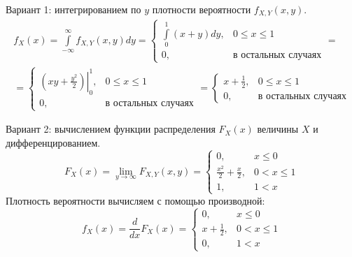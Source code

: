 \begin{enumerate}
    Вариант 1: интегрированием по $y$ плотности вероятности $f_{X,Y}(x,y)$.
    \begin{multline}
        f_X(x)
        = \int \limits_{-\infty}^{\infty} f_{X,Y}(x,y) dy
        =
        \left \{
        \begin{array}{ll}
            \int \limits_0^1 (x + y) dy, & 0 \le x \le 1              \\
            0,                           & \text{в остальных случаях}
        \end{array}
        \right . = \\
%
        =
        \left \{
        \begin{array}{ll}
            \left . \left ( x y + \frac{y^2}{2} \right ) \right |_0^1, & 0 \le x \le 1              \\
            0,                                                         & \text{в остальных случаях}
        \end{array}
        \right .
        =
        \left \{
        \begin{array}{ll}
            x + \frac{1}{2}, & 0 \le x \le 1              \\
            0,               & \text{в остальных случаях}
        \end{array}
        \right .
    \end{multline}

    Вариант 2: вычислением функции распределения $F_X(x)$ величины $X$ и дифференцированием.
    \begin{equation}
        F_X(x)
        = \lim_{y \rightarrow \infty} F_{X,Y}(x,y)
        = \left \{
        \begin{array}{ll}
            0,                           & x \le 0     \\
            \frac{x^2}{2} + \frac{x}{2}, & 0 < x \le 1 \\
            1,                           & 1 < x
        \end{array}
        \right .
    \end{equation}
    Плотность вероятности вычисляем с помощью производной:
    \begin{equation}
        f_X(x)
        = \frac{d}{dx} F_X(x)
        = \left \{
        \begin{array}{ll}
            0,               & x \le 0     \\
            x + \frac{1}{2}, & 0 < x \le 1 \\
            0,               & 1 < x
        \end{array}
        \right .
    \end{equation}


\end{enumerate}
